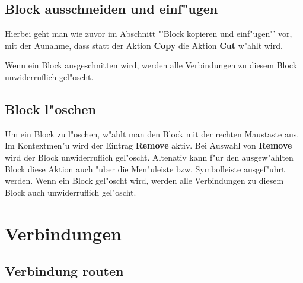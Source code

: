 \documentclass[a4paper,titlepage,12pt,ngerman]{scrbook}
\begin{document}
\subsection{Block ausschneiden und einf"ugen}
Hierbei geht man wie zuvor im Abschnitt "'Block kopieren und einf"ugen"' vor, mit der Aunahme, dass statt der Aktion {\bf Copy} die Aktion {\bf Cut} w"ahlt wird. \par
Wenn ein Block ausgeschnitten wird, werden alle Verbindungen zu diesem Block unwiderruflich gel"oscht.


\subsection{Block l"oschen}
Um ein Block zu l"oschen, w"ahlt man den Block mit der rechten Maustaste aus. Im Kontextmen"u wird der Eintrag {\bf Remove} aktiv. Bei Auswahl von {\bf Remove} wird der Block unwiderruflich gel"oscht.\newline
Altenativ kann f"ur den ausgew"ahlten Block diese Aktion auch "uber die Men"uleiste bzw. Symbolleiste ausgef"uhrt werden.\newline
Wenn ein Block gel"oscht wird, werden alle Verbindungen zu diesem Block auch unwiderruflich gel"oscht.


\section{Verbindungen}
\subsection{Verbindung routen}
\end{document}
